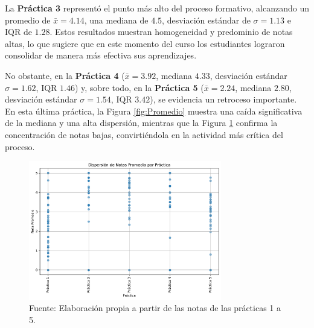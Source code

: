 \documentclass[letter,oneside,12pt,spanish]{report}
\begin{document}
La \textbf{Práctica 3} representó el punto más alto del proceso formativo, alcanzando un promedio de $\bar{x}=4.14$, una mediana de $4.5$, desviación estándar de $\sigma=1.13$ e $\text{IQR}$ de $1.28$. Estos resultados muestran homogeneidad y predominio de notas altas, lo que sugiere que en este momento del curso los estudiantes lograron consolidar de manera más efectiva sus aprendizajes.

No obstante, en la \textbf{Práctica 4} ($\bar{x}=3.92$, mediana $4.33$, desviación estándar $\sigma=1.62$, $\text{IQR}$ $1.46$) y, sobre todo, en la \textbf{Práctica 5} ($\bar{x}=2.24$, mediana $2.80$, desviación estándar $\sigma=1.54$, $\text{IQR}$ $3.42$), se evidencia un retroceso importante. En esta última práctica, la Figura \ref{fig:Promedio} muestra una caída significativa de la mediana y una alta dispersión, mientras que la Figura \ref{fig:Dispersion} confirma la concentración de notas bajas, convirtiéndola en la actividad más crítica del proceso.

\begin{figure}[ht]
	\centering
	\includegraphics[width=0.75\textwidth]{Figs/Dispersion_Notas.pdf}
	\label{fig:Dispersion}
	\\Fuente: Elaboración propia a partir de las notas de las prácticas 1 a 5.
\end{figure}
\end{document}
